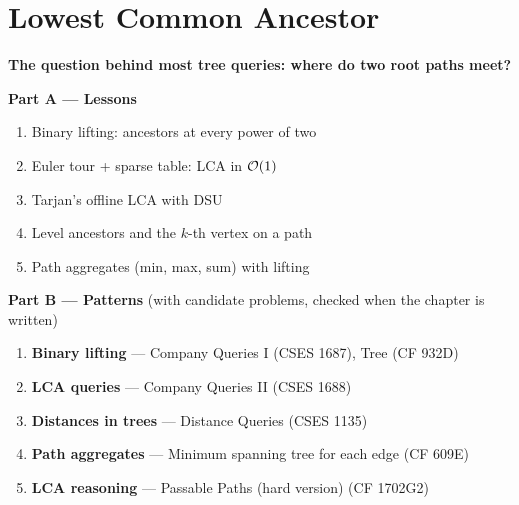 \chapter{Lowest Common Ancestor}
\label{ch:lca}

\begin{tcolorbox}[enhanced, colback=white, colframe=secondaryblue, boxrule=1pt, arc=2mm]
\textbf{\large\textcolor{primaryblue}{The question behind most tree queries: where do two root paths meet?}}
\end{tcolorbox}


\begin{plannedbox}
\textbf{Part A --- Lessons}
\begin{enumerate}[leftmargin=*, label=\textbf{A\arabic*.}, itemsep=1pt]
    \item Binary lifting: ancestors at every power of two
    \item Euler tour + sparse table: LCA in $\mathcal{O}(1)$
    \item Tarjan's offline LCA with DSU
    \item Level ancestors and the $k$-th vertex on a path
    \item Path aggregates (min, max, sum) with lifting
\end{enumerate}
\textbf{Part B --- Patterns} (with candidate problems, checked when the chapter is written)
\begin{enumerate}[leftmargin=*, label=\textbf{P\arabic*.}, itemsep=1pt]
    \item \textbf{Binary lifting} --- Company Queries I {\small\color{darkgray}(CSES 1687)}, Tree {\small\color{darkgray}(CF 932D)}
    \item \textbf{LCA queries} --- Company Queries II {\small\color{darkgray}(CSES 1688)}
    \item \textbf{Distances in trees} --- Distance Queries {\small\color{darkgray}(CSES 1135)}
    \item \textbf{Path aggregates} --- Minimum spanning tree for each edge {\small\color{darkgray}(CF 609E)}
    \item \textbf{LCA reasoning} --- Passable Paths (hard version) {\small\color{darkgray}(CF 1702G2)}
\end{enumerate}
\end{plannedbox}
